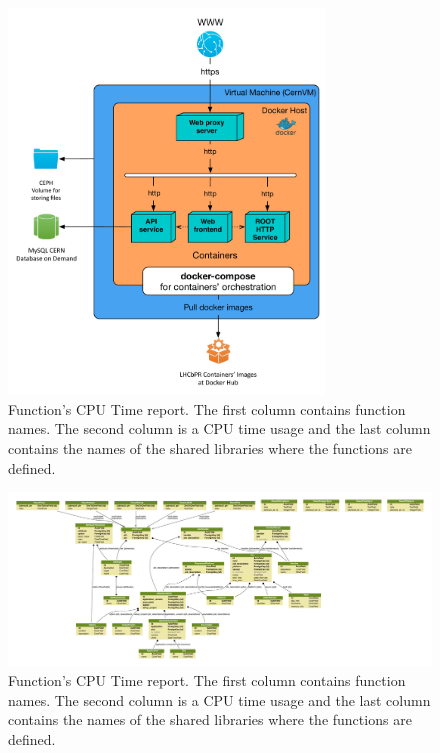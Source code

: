 \documentclass[a4paper]{jpconf}
\begin{document}
\begin{figure}[H]
\begin{minipage}{\textwidth}
\includegraphics[width=0.75\textwidth]{figs/lhcbpr-nodes.pdf}
\caption{\label{fig01}Function’s CPU Time report. The first column contains function names. The second column is a CPU 
time usage and the last column contains the names of the shared libraries where the functions are defined.}
\end{minipage}
\end{figure}

\begin{figure}[H]
\begin{minipage}{\textwidth}
\includegraphics[width=\textwidth]{figs/models.pdf}
\caption{\label{figmodels}Function’s CPU Time report. The first column contains function names. The second column is a CPU 
time usage and the last column contains the names of the shared libraries where the functions are defined.}
\end{minipage}
\end{figure}
\end{document}
